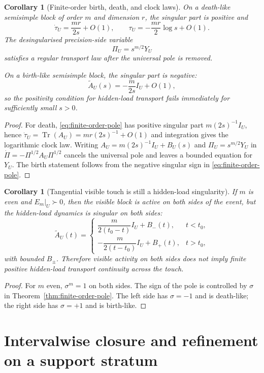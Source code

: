 \documentclass[11pt,a4paper]{article}
\numberwithin{equation}{section}
\DeclareMathOperator{\Tr}{Tr}
\theoremstyle{thmcompact}
\newtheorem{corollary}[theorem]{Corollary}
\theoremstyle{remark}
\begin{document}
\begin{corollary}[Finite-order birth, death, and clock laws]
\label{cor:finite-order-event-laws}
On a death-like semisimple block of order $m$ and dimension $r$, the singular part is positive and
\[
\dot\tau_U=\frac{mr}{2s}+O(1),
\qquad
\tau_U=-\frac{mr}{2}\log s+O(1).
\]
The desingularised precision-side variable
\[
\Pi_U=s^{m/2}Y_U
\]
satisfies a regular transport law after the universal pole is removed.

On a birth-like semisimple block, the singular part is negative:
\[
\widetilde A_U(s)=-\frac{m}{2s}I_U+O(1),
\]
so the positivity condition for hidden-load transport fails immediately for sufficiently small $s>0$.
\end{corollary}

\begin{proof}
For death, \eqref{eq:finite-order-pole} has positive singular part $m(2s)^{-1}I_U$, hence $\dot\tau_U=\Tr(A_U)=mr(2s)^{-1}+O(1)$ and integration gives the logarithmic clock law. Writing $A_U=m(2s)^{-1}I_U+B_U(s)$ and $\Pi_U=s^{m/2}Y_U$ in $\dot\Pi=-\Pi^{1/2}A_U\Pi^{1/2}$ cancels the universal pole and leaves a bounded equation for $Y_U$. The birth statement follows from the negative singular sign in \eqref{eq:finite-order-pole}.
\end{proof}

\begin{corollary}[Tangential visible touch is still a hidden-load singularity]
\label{cor:tangential-touch}
If $m$ is even and $E_m|_U\succ0$, then the visible block is active on both sides of the event, but the hidden-load dynamics is singular on both sides:
\[
\widetilde A_U(t)=
\begin{cases}
\dfrac{m}{2(t_0-t)}I_U+B_-(t), & t<t_0,\\[1ex]
-\dfrac{m}{2(t-t_0)}I_U+B_+(t), & t>t_0,
\end{cases}
\]
with bounded $B_\pm$. Therefore visible activity on both sides does not imply finite positive hidden-load transport continuity across the touch.
\end{corollary}

\begin{proof}
For $m$ even, $\sigma^m=1$ on both sides. The sign of the pole is controlled by $\sigma$ in Theorem~\ref{thm:finite-order-pole}. The left side has $\sigma=-1$ and is death-like; the right side has $\sigma=+1$ and is birth-like.
\end{proof}

\section{Intervalwise closure and refinement on a support stratum}
\end{document}
